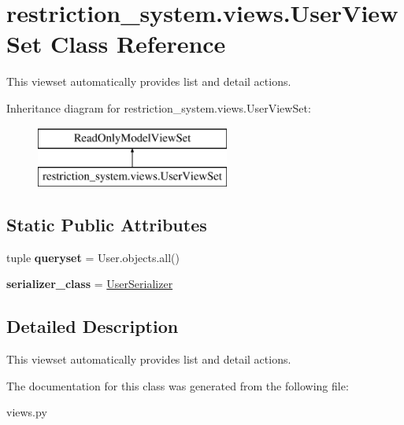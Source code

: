\hypertarget{classrestriction__system_1_1views_1_1UserViewSet}{}\section{restriction\+\_\+system.\+views.\+User\+View\+Set Class Reference}
\label{classrestriction__system_1_1views_1_1UserViewSet}


This viewset automatically provides {\ttfamily list} and {\ttfamily detail} actions.  


Inheritance diagram for restriction\+\_\+system.\+views.\+User\+View\+Set\+:\begin{figure}[H]
\begin{center}
\leavevmode
\includegraphics[height=2.000000cm]{classrestriction__system_1_1views_1_1UserViewSet}
\end{center}
\end{figure}
\subsection*{Static Public Attributes}
\begin{DoxyCompactItemize}
\item 
\hypertarget{classrestriction__system_1_1views_1_1UserViewSet_a0fc7951eaf3f2932065a5174f30d5faf}{}tuple {\bfseries queryset} = User.\+objects.\+all()\label{classrestriction__system_1_1views_1_1UserViewSet_a0fc7951eaf3f2932065a5174f30d5faf}

\item 
\hypertarget{classrestriction__system_1_1views_1_1UserViewSet_a0113ba1a521232d4774e66b4fe1e1481}{}{\bfseries serializer\+\_\+class} = \hyperlink{classrestriction__system_1_1serializers_1_1UserSerializer}{User\+Serializer}\label{classrestriction__system_1_1views_1_1UserViewSet_a0113ba1a521232d4774e66b4fe1e1481}

\end{DoxyCompactItemize}


\subsection{Detailed Description}
This viewset automatically provides {\ttfamily list} and {\ttfamily detail} actions. 



The documentation for this class was generated from the following file\+:\begin{DoxyCompactItemize}
\item 
views.\+py\end{DoxyCompactItemize}
